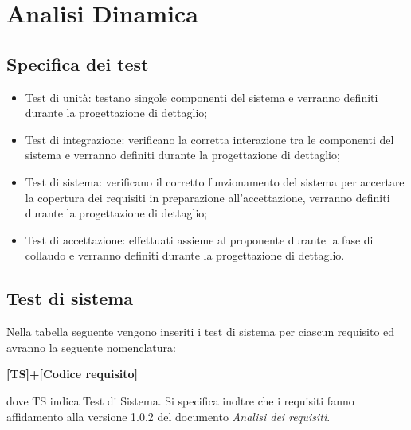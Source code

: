 \section{Analisi Dinamica}
\label{sec:analisi_dinamica}

    \subsection{Specifica dei test}
    \begin{itemize}
        \item Test di unità: testano singole componenti del sistema e verranno definiti durante la progettazione di dettaglio;
        \item Test di integrazione: verificano la corretta interazione tra le componenti del sistema e verranno definiti durante la progettazione di dettaglio;
        \item Test di sistema: verificano il corretto funzionamento del sistema per accertare la copertura dei requisiti in preparazione all'accettazione, verranno definiti durante la progettazione di dettaglio;
        \item Test di accettazione: effettuati assieme al proponente durante la fase di collaudo e verranno definiti durante la progettazione di dettaglio.
    \end{itemize}

    \subsection{Test di sistema}

    Nella tabella seguente vengono inseriti i test di sistema per ciascun requisito ed avranno la seguente nomenclatura:\\
    \begin{center}
        \textbf{[TS]+[Codice requisito]}
    \end{center}
    dove TS indica Test di Sistema.
    Si specifica inoltre che i requisiti fanno affidamento alla versione 1.0.2 del documento \textit{Analisi dei requisiti}.



